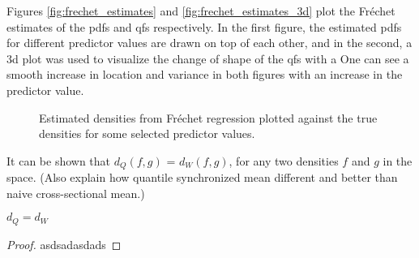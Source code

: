 Figures \ref{fig:frechet_estimates} and \ref{fig:frechet_estimates_3d} plot the Fréchet
estimates of the pdfs and qfs respectively. In the first figure, the estimated pdfs for
different predictor values are drawn on top of each other, and in the second, a 3d plot
was used to visualize the change of shape of the qfs with a One can see a smooth
increase in location and variance in both figures with an increase in the predictor
value.


\begin{figure}[h]
    \centering
    \resizebox{1\textwidth}{!}{}
    \caption[Comparison: estimated vs. true densities --- Fréchet]{Estimated
    densities from Fréchet regression plotted against the true densities for some selected
    predictor values.}
    \label{fig:frechet_est_vs_true}
\end{figure}


It can be shown that $d_Q(f,g)$ = $d_W(f,g)$, for any two densities $f$ and $g$ in the
space. (Also explain how quantile synchronized mean different and better than naive
cross-sectional mean.)
\begin{lemma}
    \label{lemma:dqeqdw}
    $d_Q = d_W$
\end{lemma}
\begin{proof}
    asdsadasdads
\end{proof}

